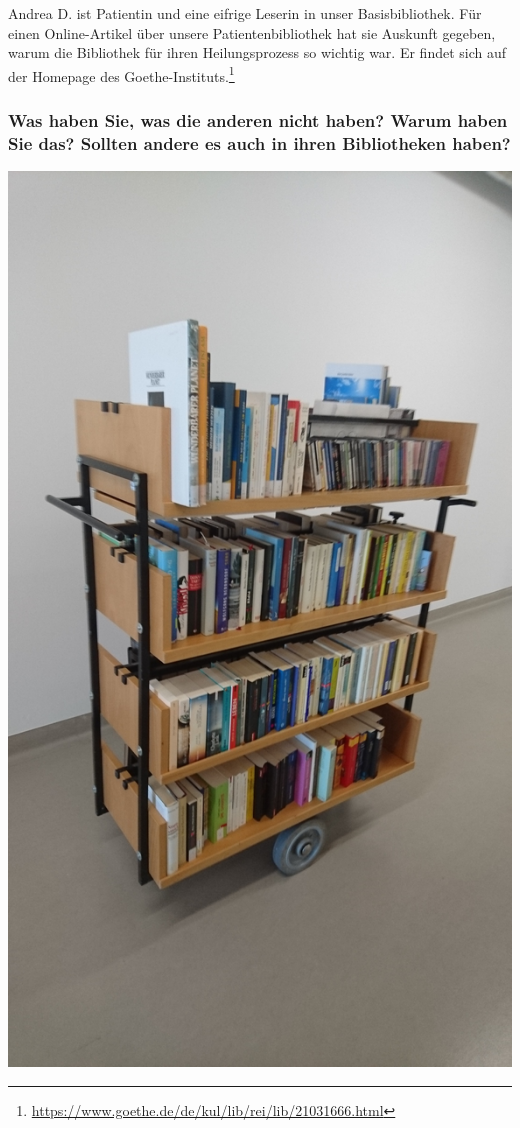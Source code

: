 Andrea D. ist Patientin und eine eifrige Leserin in unser
Basisbibliothek. Für einen Online-Artikel über unsere
Patientenbibliothek hat sie Auskunft gegeben, warum die Bibliothek für
ihren Heilungsprozess so wichtig war. Er findet sich auf der Homepage
des Goethe-Instituts.\footnote{\url{https://www.goethe.de/de/kul/lib/rei/lib/21031666.html}}

\hypertarget{was-haben-sie-was-die-anderen-nicht-haben-warum-haben-sie-das-sollten-andere-es-auch-in-ihren-bibliotheken-haben}{%
\subsubsection*{Was haben Sie, was die anderen nicht haben? Warum haben Sie
das? Sollten andere es auch in ihren Bibliotheken
haben?}\label{was-haben-sie-was-die-anderen-nicht-haben-warum-haben-sie-das-sollten-andere-es-auch-in-ihren-bibliotheken-haben}}

\begin{center}
\includegraphics{patientenbibliothek/img/Buecherwagen.jpg}
\end{center}

